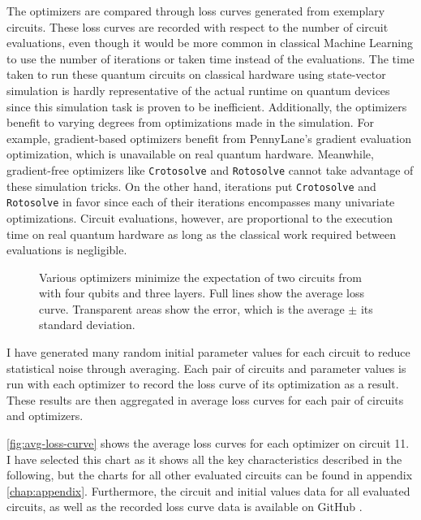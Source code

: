 The optimizers are compared through loss curves generated from exemplary
circuits.
These loss curves are recorded with respect to the number of circuit
evaluations, even though it would be more common in classical Machine Learning
to use the number of iterations or taken time instead of the evaluations.
The time taken to run these quantum circuits on classical hardware using
state-vector simulation is hardly representative of the actual runtime on
quantum devices since this simulation task is proven to be inefficient.
Additionally, the optimizers benefit to varying degrees from optimizations made
in the simulation.
For example, gradient-based optimizers benefit from PennyLane's gradient
evaluation optimization, which is unavailable on real quantum hardware.
Meanwhile, gradient-free optimizers like \texttt{Crotosolve} and
\texttt{Rotosolve} cannot take advantage of these simulation tricks.
On the other hand, iterations put \texttt{Crotosolve} and \texttt{Rotosolve} in
favor since each of their iterations encompasses many univariate optimizations.
Circuit evaluations, however, are proportional to the execution time on real
quantum hardware as long as the classical work required between evaluations is
negligible.

\begin{figure}
    \centering
    \caption{Various optimizers minimize the expectation of two circuits from
        \cite{sim_expressibility_2019} with four qubits and three layers.
        Full lines show the average loss curve.
        Transparent areas show the error, which is the average $\pm$ its
        standard deviation.}
    \label{fig:avg-loss-curve}
\end{figure}

I have generated many random initial parameter values for each circuit to
reduce statistical noise through averaging.
Each pair of circuits and parameter values is run with each optimizer to
record the loss curve of its optimization as a result.
These results are then aggregated in average loss curves for each pair of
circuits and optimizers.

\autoref{fig:avg-loss-curve} shows the average loss curves for each
optimizer on circuit 11.
I have selected this chart as it shows all the key characteristics described in
the following, but the charts for all other evaluated circuits can be found in
appendix \ref{chap:appendix}.
Furthermore, the circuit and initial values data for all evaluated circuits, as
well as the recorded loss curve data is available on GitHub
\cite{schweikart_schweikartcrotosolve_2023}.

